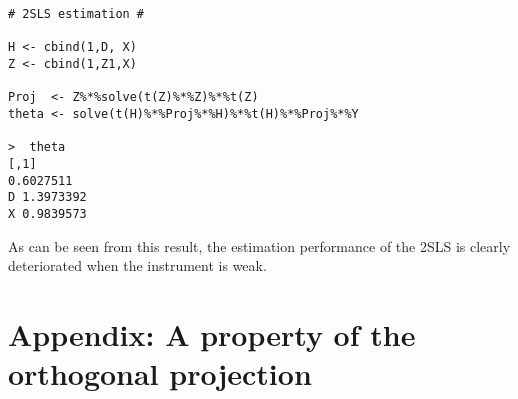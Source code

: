 \documentclass[11pt, A4paper, openany, uplatex]{book}
\begin{document}
\begin{lstlisting}[basicstyle=\ttfamily\footnotesize, frame=single]
# 2SLS estimation #

H <- cbind(1,D, X)
Z <- cbind(1,Z1,X)

Proj  <- Z%*%solve(t(Z)%*%Z)%*%t(Z)
theta <- solve(t(H)%*%Proj%*%H)%*%t(H)%*%Proj%*%Y

>  theta
[,1]
0.6027511
D 1.3973392
X 0.9839573
\end{lstlisting}
As can be seen from this result, the estimation performance of the 2SLS is clearly deteriorated when the instrument is weak.

\section*{Appendix: A property of the orthogonal projection}
	
\end{document}
